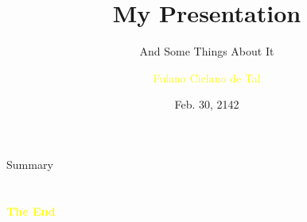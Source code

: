 \documentclass[aspectratio=43]{beamer}
\title{My Presentation} %
\subtitle{And Some Things About It}
\author[F.de Tal]{\textcolor{yellow}{Fulano Ciclano de Tal}}
\institute[IMUFSP]{
    \textcolor{white}{Institute of Mathematics}%
    \\%
    \textcolor{white}{Federal University of Some Place}%
} %
\date{Feb. 30, 2142}
\begin{document}
    
    \frame{\titlepage}
    
    \begin{frame}{Summary}
        \tableofcontents
    \end{frame}
    
    
    
    
    
%     
    
%    
    
    

    \section{}
    \begin{frame}{}
        \centering
            \Huge\bfseries
        \textcolor{yellow}{The End}
    \end{frame}
\end{document}

